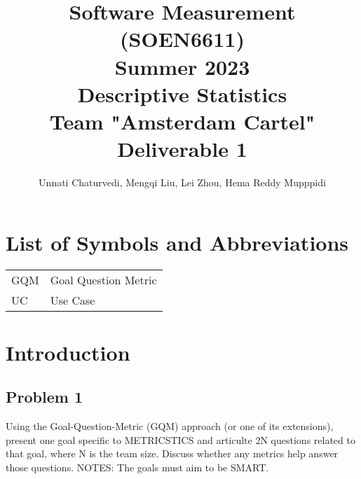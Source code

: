 \documentclass[12pt,letterpaper]{report}
\begin{document}
\title{Software Measurement (SOEN6611)\\[.5em]
Summer 2023\\[.5em]
Descriptive Statistics\\[.5em]
Team "Amsterdam Cartel"\\[.5em]
Deliverable 1}
\author{Unnati Chaturvedi, Mengqi Liu, Lei Zhou, Hema Reddy Mupppidi}
\maketitle

\setcounter{page}{0}

\tableofcontents

\chapter*{List of Symbols and Abbreviations}



\noindent\begin{tabular}{ll}
GQM & Goal Question Metric\\
UC & Use Case

\end{tabular}

\listoffigures{}


\chapter{Introduction}

\section{Problem 1}

Using the Goal-Question-Metric (GQM) approach (or one of its extensions), present one goal specific to METRICSTICS and articulte 2N questions related to that goal, where N is the team size. Discuss whether any metrics help answer those questions. NOTES: The goals must aim to be SMART. 
					
\end{document}
